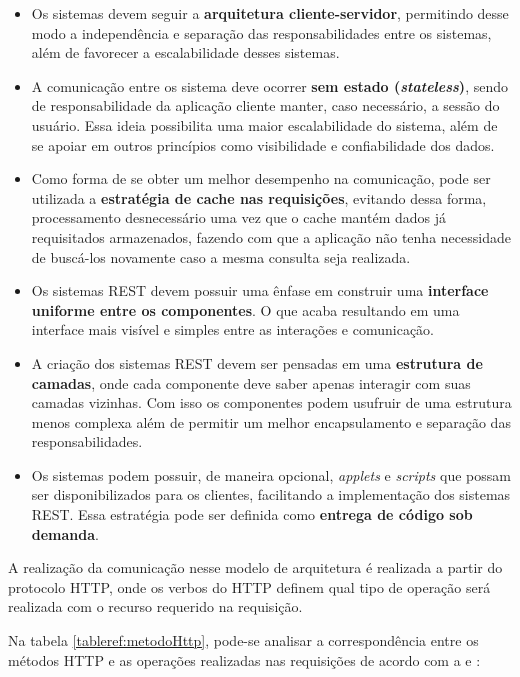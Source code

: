 \begin{itemize}
		\item Os sistemas devem seguir a \textbf{arquitetura cliente-servidor}, permitindo desse modo a independência e separação das responsabilidades entre os sistemas, além de favorecer a escalabilidade desses sistemas.
		
		\item A comunicação entre os sistema deve ocorrer \textbf{sem estado (\textit{stateless})}, sendo de responsabilidade da aplicação cliente manter, caso necessário, a sessão do usuário. Essa ideia possibilita uma maior escalabilidade do sistema, além de se apoiar em outros princípios como visibilidade e confiabilidade dos dados.
		
		\item Como forma de se obter um melhor desempenho na comunicação, pode ser utilizada a \textbf{estratégia de cache nas requisições}, evitando dessa forma, processamento desnecessário uma vez que o cache mantém dados já requisitados armazenados, fazendo com que a aplicação não tenha necessidade de buscá-los novamente caso a mesma consulta seja realizada.
		
		\item Os sistemas REST devem possuir uma ênfase em construir uma \textbf{interface uniforme entre os componentes}. O que acaba resultando em uma interface mais visível e simples entre as interações e comunicação.
		
		\item A criação dos sistemas REST devem ser pensadas em uma \textbf{estrutura de camadas}, onde cada componente deve saber apenas interagir com suas camadas vizinhas. Com isso os componentes podem usufruir de uma estrutura menos complexa além de permitir um melhor encapsulamento e separação das responsabilidades.
		
		\item Os sistemas podem possuir, de maneira opcional, \textit{applets} e \textit{scripts} que possam ser disponibilizados para os clientes, facilitando a implementação dos sistemas REST. Essa estratégia pode ser definida como \textbf{entrega de código sob demanda}.
	\end{itemize}

A realização da comunicação nesse modelo de arquitetura é realizada a partir do protocolo HTTP, onde os verbos do HTTP definem qual tipo de operação será realizada com o recurso requerido na requisição.

Na tabela \ref{tableref:metodoHttp}, pode-se analisar a correspondência entre os métodos HTTP e as operações realizadas nas requisições de acordo com a  e :

